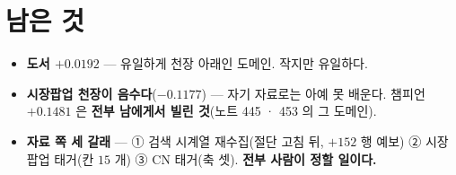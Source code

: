 \documentclass[11pt]{article}
\begin{document}
\section*{남은 것}

\begin{itemize}
\item \textbf{도서 $+0.0192$} --- 유일하게 천장 아래인 도메인. 작지만
유일하다.
\item \textbf{시장팝업 천장이 음수다}($-0.1177$) --- 자기 자료로는 아예
못 배운다. 챔피언 $+0.1481$ 은 \textbf{전부 남에게서 빌린 것}(노트 445 ·
453 의 그 도메인).
\item \textbf{자료 쪽 세 갈래} --- ① 검색 시계열 재수집(절단 고침 뒤,
$+152$ 행 예보) ② 시장팝업 태거(칸 $15$ 개) ③ CN 태거(축 셋).
\textbf{전부 사람이 정할 일이다.}
\end{itemize}
\end{document}
